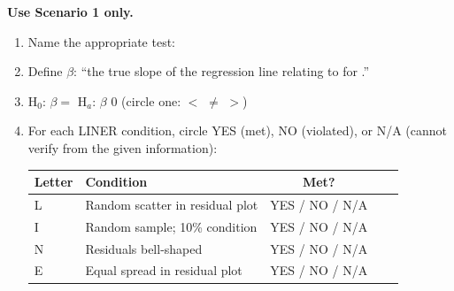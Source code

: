 \documentclass[10pt]{article}
\begin{document}
\begin{tcolorbox}[colback=white, colframe=black!40,
    title=\textbf{Tier R --- Remediate},
    fonttitle=\bfseries, arc=2mm, left=3mm, right=3mm, top=2mm, bottom=2mm]

\textbf{Use Scenario 1 only.}

\begin{enumerate}[label=\alph*.]

  \item Name the appropriate test: \blank{7cm}

  \item Define $\beta$: ``the true slope of the regression line relating
        \blank{4cm} to \blank{4cm} for \blank{4cm}.''

  \item H$_0$: $\beta = $ \blank{1.5cm} \qquad H$_a$: $\beta$ \blank{1.5cm} 0
        \quad (circle one: \quad $<$ \quad $\ne$ \quad $>$)

  \item For each LINER condition, circle YES (met), NO (violated), or N/A
        (cannot verify from the given information):

        \begin{tabularx}{\linewidth}{lXccc}
            \textbf{Letter} & \textbf{Condition} & \textbf{Met?} \\
            \hline
            L & Random scatter in residual plot & YES \quad / \quad NO \quad / \quad N/A \\
            I & Random sample; 10\% condition   & YES \quad / \quad NO \quad / \quad N/A \\
            N & Residuals bell-shaped            & YES \quad / \quad NO \quad / \quad N/A \\
            E & Equal spread in residual plot    & YES \quad / \quad NO \quad / \quad N/A \\
        \end{tabularx}

\end{enumerate}
\end{tcolorbox}
\end{document}
